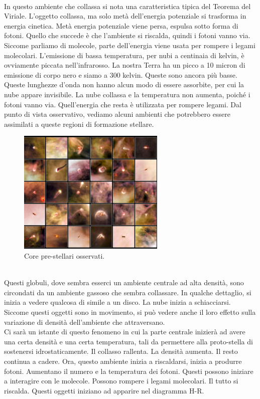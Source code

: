 \documentclass[a4paper,11pt]{article}
\begin{document}
    \\
In questo ambiente che collassa si nota una caratteristica tipica del Teorema del Viriale. L'oggetto collassa, ma solo metà dell'energia potenziale si trasforma in energia cinetica. Metà energia potenziale viene persa, espulsa sotto forma di fotoni. Quello che succede è che l'ambiente si riscalda, quindi i fotoni vanno via. Siccome parliamo di molecole, parte dell'energia viene usata per rompere i legami molecolari. L'emissione di bassa temperatura, per nubi a centinaia di kelvin, è ovviamente piccata nell'infrarosso. La nostra Terra ha un picco a 10 micron di emissione di corpo nero e siamo a 300 kelvin. Queste sono ancora più basse. Queste lunghezze d'onda non hanno alcun modo di essere assorbite, per cui la nube appare invisibile. La nube collassa e la temperatura non aumenta, poiché i fotoni vanno via. Quell'energia che resta è utilizzata per rompere legami. Dal punto di vista osservativo, vediamo alcuni ambienti che potrebbero essere assimilati a queste regioni di formazione stellare. 
\begin{figure}[h!!]
        \centering
        \includegraphics[width=7cm]{lezione 28 novembre/corestellari.png}
        \caption{Core pre-stellari osservati.}
        \label{lezione 28 novembre/corestellari.png}
    \end{figure}
    \\
Questi globuli, dove sembra esserci un ambiente centrale ad alta densità, sono circondati da un ambiente gassoso che sembra collassare. In qualche dettaglio, si inizia a vedere qualcosa di simile a un disco. La nube inizia a schiacciarsi. Siccome questi oggetti sono in movimento, si può vedere anche il loro effetto sulla variazione di densità dell'ambiente che attraversano. \\ Ci sarà un istante di questo fenomeno in cui la parte centrale inizierà ad avere una certa densità e una certa temperatura, tali da permettere alla proto-stella di sostenersi idrostaticamente. Il collasso rallenta. La densità aumenta. Il resto continua a cadere. Ora, questo ambiente inizia a riscaldarsi, inizia a produrre fotoni. Aumentano il numero e la temperatura dei fotoni. Questi possono iniziare a interagire con le molecole. Possono rompere i legami molecolari. Il tutto si riscalda. Questi oggetti iniziano ad apparire nel diagramma H-R. 
\end{document}
